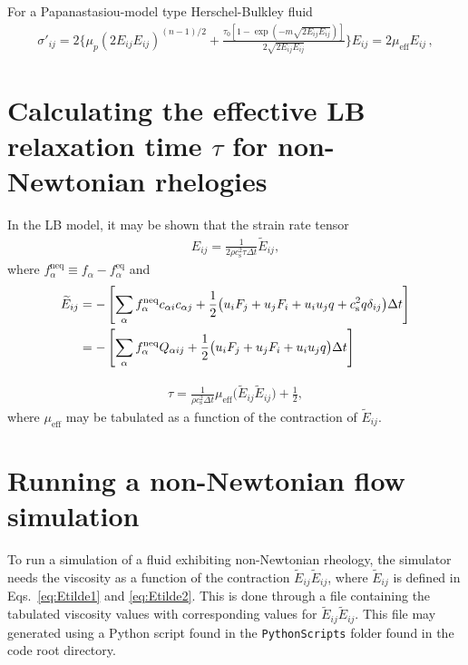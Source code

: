 \documentclass[11pt,a4paper]{report}
\begin{document}
For a Papanastasiou-model type Herschel-Bulkley fluid
\begin{align}
\sigma'_{i j} = 2\Bigg\{\mu_p \left(2E_{ij}E_{ij}\right)^{(n-1)/2} + \frac{\tau_0 \left[1-\exp\left(-m \sqrt{2E_{ij}E_{ij}}\right)\right]}{2\sqrt{2E_{ij}E_{ij}}} \Bigg\} E_{ij} = 2\mu_\mathrm{eff} E_{ij} \, ,
\end{align}



\section{Calculating the effective LB relaxation time $\tau$ for non-Newtonian rhelogies}
In the LB model, it may be shown that the strain rate tensor
\begin{align}
E_{ij} = \frac{1}{2 \rho c^2_\mathrm{s} \tau \Delta t}\widetilde{E}_{ij},\label{eq:Etilde1}
\end{align}
where ${f_\alpha^\mathrm{neq}\equiv f_\alpha - f_\alpha^\mathrm{eq}}$ and
\begin{align}
\widetilde{E}_{ij} &= -\left[\sum_\alpha f_\alpha^\mathrm{neq} c_{\alpha i} c_{\alpha j} + \frac{1}{2} \big(u_iF_j+u_jF_i + u_i u_j q + c^2_\mathrm{s} q \delta_{ij}\big)\Delta t\right] \notag\\
&= -\left[\sum_\alpha f_\alpha^\mathrm{neq} Q_{\alpha ij} + \frac{1}{2} \big(u_iF_j+u_jF_i + u_i u_j q \big)\Delta t\right]\label{eq:Etilde2}
\end{align}

\begin{align}
\tau = \frac{1}{\rho c^2_\mathrm{s} \Delta t}\mu_\mathrm{eff}\Big(\widetilde{E}_{ij}\widetilde{E}_{ij}\Big)+\frac{1}{2},
\end{align}
where $\mu_\mathrm{eff}$ may be tabulated as a function of the contraction of $\widetilde{E}_{ij}$.

\section{Running a non-Newtonian flow simulation}
To run a simulation of a fluid exhibiting non-Newtonian rheology, the simulator needs the viscosity as a function of the contraction $\widetilde{E}_{ij}\widetilde{E}_{ij}$, where $\widetilde{E}_{ij}$ is defined in Eqs.~\eqref{eq:Etilde1} and \eqref{eq:Etilde2}. This is done through a file containing the tabulated viscosity values with corresponding values for $\widetilde{E}_{ij}\widetilde{E}_{ij}$. This file may generated using a Python script found in the \texttt{PythonScripts} folder found in the code root directory.
\end{document}
